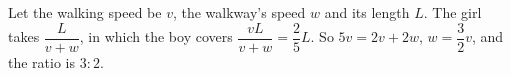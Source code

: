 Let the walking speed be $v$, the walkway's speed $w$ and its length $L$. The girl takes $\dfrac{L}{v+w}$, in which the boy covers $\dfrac{vL}{v+w}=\dfrac{2}{5}L$. So $5v=2v+2w$, $w=\dfrac{3}{2}v$, and the ratio is $\boxed{3:2}$.
